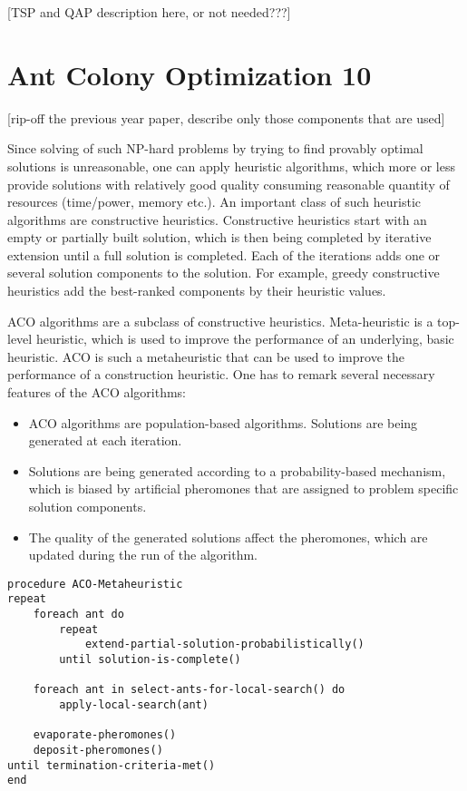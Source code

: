 \documentclass[11pt,a4paper,oneside]{book}
\begin{document}
[TSP and QAP description here, or not needed???] \newline





\section{Ant Colony Optimization 10}

[rip-off the previous year paper, describe only those components that are used] \newline

Since solving of such NP-hard problems by trying to find provably optimal solutions is unreasonable, one can apply heuristic algorithms, which more or less provide solutions with relatively good quality consuming reasonable quantity of resources (time/power, memory etc.). An important class of such heuristic algorithms are constructive heuristics. Constructive heuristics start with an empty or partially built solution, which is then being completed by iterative extension until a full solution is completed. Each of the iterations adds one or several solution components to the solution. For example, greedy constructive heuristics  add the best-ranked components by their heuristic values.

ACO algorithms are a subclass of constructive heuristics. Meta-heuristic is a top-level heuristic, which is used to improve the performance of an underlying, basic heuristic. ACO is such a metaheuristic that can be used to improve the performance of a construction heuristic. One has to remark several necessary features of the ACO algorithms:

\begin{itemize}
\item ACO algorithms are population-based algorithms. Solutions are being generated at each iteration.
\item Solutions are being generated according to a probability-based mechanism, which is biased by artificial pheromones that are assigned to problem specific solution components.
\item The quality of the generated solutions affect the pheromones, which are updated during the run of the algorithm.
\end{itemize}


\begin{minipage}[c]{0.95\textwidth}
\begin{lstlisting}[caption={General ACO pseudo-code}, label={lst:aco}]
procedure ACO-Metaheuristic
repeat
	foreach ant do
		repeat
			extend-partial-solution-probabilistically()
		until solution-is-complete()
	
	foreach ant in select-ants-for-local-search() do
		apply-local-search(ant)
	
	evaporate-pheromones()
	deposit-pheromones()
until termination-criteria-met()
end
\end{lstlisting}
\end{minipage}
\end{document}
